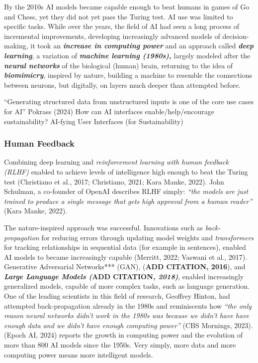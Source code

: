 \documentclass[
  letterpaper,
  DIV=11,
  numbers=noendperiod]{scrartcl}
\begin{document}
By the 2010s AI models became capable enough to beat humans in games of
Go and Chess, yet they did not yet pass the Turing test. AI use was
limited to specific tasks. While over the years, the field of AI had
seen a long process of incremental improvements, developing increasingly
advanced models of decision-making, it took an \textbf{\emph{increase in
computing power}} and an approach called \textbf{\emph{deep learning}},
a variation of \textbf{\emph{machine learning (1980s),}} largely modeled
after the \textbf{\emph{neural networks}} of the biological (human)
brain, returning to the idea of \textbf{\emph{biomimicry}}, inspired by
nature, building a machine to resemble the connections between neurons,
but digitally, on layers much deeper than attempted before.

``Generating structured data from unstructured inputs is one of the core
use cases for AI'' Pokrass (2024) How can AI interfaces
enable/help/encourage sustainability? AI-fying User Interfaces (for
Sustainability)

\subsubsection{Human Feedback}\label{human-feedback}

Combining deep learning and \emph{reinforcement learning with human
feedback (RLHF)} enabled to achieve levels of intelligence high enough
to beat the Turing test (Christiano et al., 2017; Christiano, 2021; Kara
Manke, 2022). John Schulman, a co-founder of OpenAI describes RLHF
simply: \emph{``the models are just trained to produce a single message
that gets high approval from a human reader''} (Kara Manke, 2022).

The nature-inspired approach was successful. Innovations such as
\emph{back-propagation} for reducing errors through updating model
weights and \emph{transformers} for tracking relationships in sequential
data (for example in sentences), enabled AI models to became
increasingly capable (Merritt, 2022; Vaswani et al., 2017). Generative
Adversarial Networks*** (GAN), (\textbf{ADD CITATION, 2016}), and
\textbf{\emph{Large Language Models (}ADD CITATION\emph{, 2018)}},
enabled increasingly generalized models, capable of more complex tasks,
such as language generation. One of the leading scientists in this field
of research, Geoffrey Hinton, had attempted back-propagation already in
the 1980s and reminiscents how \emph{``the only reason neural networks
didn't work in the 1980s was because we didn't have have enough data and
we didn't have enough computing power''} (CBS Mornings, 2023). (Epoch
AI, 2024) reports the growth in computing power and the evolution of
more than 800 AI models since the 1950s. Very simply, more data and more
computing power means more intelligent models.
\end{document}
